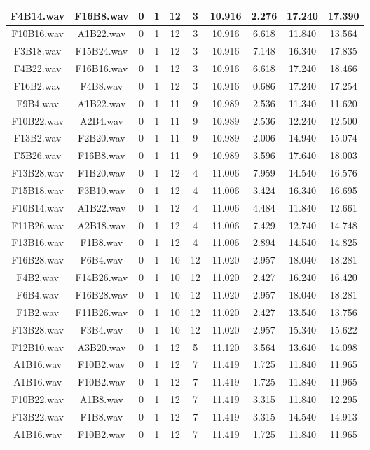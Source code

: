 \documentclass[11pt,a4paper]{book}
\begin{document}
\begin{longtable}[c]{|c|c|c|c|c|c|c|c|c|c|}
F4B14.wav&F16B8.wav&0&1&12&3&10.916&2.276&17.240&17.390\\ \hline
F10B16.wav&A1B22.wav&0&1&12&3&10.916&6.618&11.840&13.564\\ \hline
F3B18.wav&F15B24.wav&0&1&12&3&10.916&7.148&16.340&17.835\\ \hline
F4B22.wav&F16B16.wav&0&1&12&3&10.916&6.618&17.240&18.466\\ \hline
F16B2.wav&F4B8.wav&0&1&12&3&10.916&0.686&17.240&17.254\\ \hline
F9B4.wav&A1B22.wav&0&1&11&9&10.989&2.536&11.340&11.620\\ \hline
F10B22.wav&A2B4.wav&0&1&11&9&10.989&2.536&12.240&12.500\\ \hline
F13B2.wav&F2B20.wav&0&1&11&9&10.989&2.006&14.940&15.074\\ \hline
F5B26.wav&F16B8.wav&0&1&11&9&10.989&3.596&17.640&18.003\\ \hline
F13B28.wav&F1B20.wav&0&1&12&4&11.006&7.959&14.540&16.576\\ \hline
F15B18.wav&F3B10.wav&0&1&12&4&11.006&3.424&16.340&16.695\\ \hline
F10B14.wav&A1B22.wav&0&1&12&4&11.006&4.484&11.840&12.661\\ \hline
F11B26.wav&A2B18.wav&0&1&12&4&11.006&7.429&12.740&14.748\\ \hline
F13B16.wav&F1B8.wav&0&1&12&4&11.006&2.894&14.540&14.825\\ \hline
F16B28.wav&F6B4.wav&0&1&10&12&11.020&2.957&18.040&18.281\\ \hline
F4B2.wav&F14B26.wav&0&1&10&12&11.020&2.427&16.240&16.420\\ \hline
F6B4.wav&F16B28.wav&0&1&10&12&11.020&2.957&18.040&18.281\\ \hline
F1B2.wav&F11B26.wav&0&1&10&12&11.020&2.427&13.540&13.756\\ \hline
F13B28.wav&F3B4.wav&0&1&10&12&11.020&2.957&15.340&15.622\\ \hline
F12B10.wav&A3B20.wav&0&1&12&5&11.120&3.564&13.640&14.098\\ \hline
A1B16.wav&F10B2.wav&0&1&12&7&11.419&1.725&11.840&11.965\\ \hline
A1B16.wav&F10B2.wav&0&1&12&7&11.419&1.725&11.840&11.965\\ \hline
F10B22.wav&A1B8.wav&0&1&12&7&11.419&3.315&11.840&12.295\\ \hline
F13B22.wav&F1B8.wav&0&1&12&7&11.419&3.315&14.540&14.913\\ \hline
A1B16.wav&F10B2.wav&0&1&12&7&11.419&1.725&11.840&11.965\\ \hline

\end{longtable}
\end{document}
